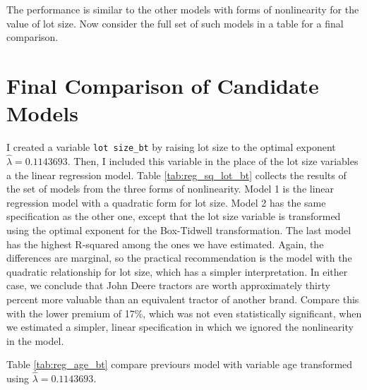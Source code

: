 \documentclass[11pt]{article}
\begin{document}



The performance is similar to the other models with
forms of nonlinearity for the value of lot size.
Now consider the full set of such models in a table for a final comparison.


\pagebreak
\section{Final Comparison of Candidate Models}

I created a variable \texttt{lot size\_bt}
by raising lot size to the optimal exponent 
$\hat{\lambda} = 0.1143693$. 
Then, I included this variable in the place of 
the lot size variables a the linear regression model.
% 
Table \ref{tab:reg_sq_lot_bt} collects the results
of the set of models from the three forms of nonlinearity.
Model 1 is the linear regression model with 
a quadratic form for lot size. 
Model 2 
has the same specification as the other one, 
except that the lot size variable is transformed using the optimal
exponent for the Box-Tidwell transformation. 
% 
The last model has the highest R-squared
among the ones we have estimated.
Again, the differences are marginal, so the practical recommendation
is the model with the quadratic relationship for lot size, 
which has a simpler interpretation.
In either case, we conclude that John Deere tractors are worth
approximately thirty percent more valuable
than an equivalent tractor of another brand. 
Compare this with the lower premium of 17\%, 
which was not even statistically significant, 
when we estimated a simpler, linear specification
in which we ignored the nonlinearity in the model. 



Table \ref{tab:reg_age_bt} compare previours model with variable age transformed using $\hat{\lambda} = 0.1143693$. 


\end{document}
